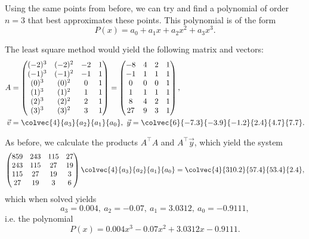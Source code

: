 \begin{example}
  Using the same points from before, we can try and find a polynomial of order $n=3$ that best approximates these points. This polynomial is of the form
  \begin{equation*}
    P(x) = a_{0} + a_{1}x + a_{2}x^{2} + a_{3}x^{3}.
  \end{equation*}

  The least square method would yield the following matrix and vectors:
  \begin{align*}
    A &= \begin{pmatrix} (-2)^{3} & (-2)^{2} & -2 & 1 \\ (-1)^{3} & (-1)^{2} & -1 & 1 \\ (0)^{3} & (0)^{2} & 0 & 1 \\ (1)^{3} & (1)^{2} & 1 & 1 \\ (2)^{3} & (2)^{2} & 2 & 1 \\ (3)^{3} & (3)^{2} & 3 & 1 \end{pmatrix}  = \begin{pmatrix} -8 & 4 & 2 & 1 \\ -1 & 1 & 1 & 1 \\ 0 & 0 & 0 & 1 \\ 1 & 1 & 1 & 1 \\ 8 & 4 & 2 & 1 \\ 27 & 9 & 3 & 1 \end{pmatrix},\\
    \vec{v} &= \colvec{4}{a_{3}}{a_{2}}{a_{1}}{a_{0}},\ \vec{y} = \colvec{6}{-7.3}{-3.9}{-1.2}{2.4}{4.7}{7.7}.
  \end{align*}

  As before, we calculate the products $A^{\top}A$ and $A^{\top}\vec{y}$, which yield the system
  \begin{equation*}
    \begin{pmatrix} 859 & 243 & 115 & 27 \\ 243 & 115 & 27 & 19 \\ 115 & 27 & 19 & 3 \\ 27 & 19 & 3 & 6 \end{pmatrix}\colvec{4}{a_{3}}{a_{2}}{a_{1}}{a_{0}} = \colvec{4}{310.2}{57.4}{53.4}{2.4},
  \end{equation*}
  which when solved yields
  \begin{equation*}
    a_{3} = 0.004,\ a_{2}=-0.07,\ a_{1}=3.0312,\ a_{0}=-0.9111,
  \end{equation*}
  i.e. the polynomial
  \begin{equation*}
    P(x) = 0.004x^{3} -0.07x^{2} + 3.0312x - 0.9111.
  \end{equation*}
\end{example}

